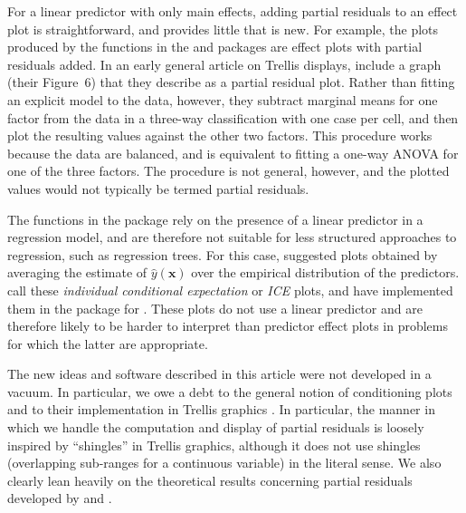 \documentclass[article]{jss}
\newcommand{\x}{\mathbf{x}}
\newcommand{\R}{\proglang{R}}
\begin{document}
For a linear predictor with only main effects, adding partial
residuals to an effect plot is straightforward, and provides little
that is new.  For example, the plots produced by the 
functions in the  \citep{Wood17} and  \citep{gam}
packages are effect plots with partial residuals added. In an early
general article on Trellis displays, \cite{becker96} include a graph
(their Figure~6) that they describe as a partial residual plot. Rather
than fitting an explicit model to the data, however, they subtract
marginal means for one factor from the data in a three-way
classification with one case per cell, and then plot the resulting
values against the other two factors. This procedure works because the
data are balanced, and is equivalent to fitting a one-way ANOVA for
one of the three factors. The procedure is not general, however, and
the plotted values would not typically be termed partial residuals.

The functions in the  package rely on the presence of a
linear predictor in a regression model, and are therefore not suitable
for less structured approaches to regression, such as regression
trees.  For this case, \cite {Friedman01} suggested plots obtained by
averaging the estimate of $\widehat{y}(\x)$ over the empirical
distribution of the predictors.  \cite{ice15} call these
\emph{individual conditional expectation} or \emph{ICE} plots, and
have implemented them in the  package \citep{ice15} for
\R{}. These plots do not use a linear predictor and are therefore
likely to be harder to interpret than predictor effect plots in
problems for which the latter are appropriate.

The new ideas and software described in this article were not
developed in a vacuum. In particular, we owe a debt to the general
notion of conditioning plots \citep{Cleveland93, Cleveland94} and to
their implementation in Trellis graphics \citep{BeckerCleveland96}. In
particular, the manner in which we handle the computation and display
of partial residuals is loosely inspired by ``shingles'' in Trellis
graphics, although it does not use shingles (overlapping sub-ranges
for a continuous variable) in the literal sense. We also clearly lean
heavily on the theoretical results concerning partial residuals
developed by \citet{Cook93} and \citet{CookCroos98}.
\end{document}
